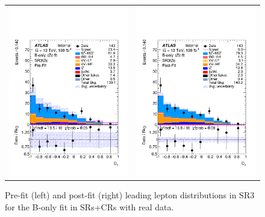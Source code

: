 \begin{figure}[htbp]
	\centering
	\begin{tabular}{cc}
		\includegraphics[width=.45\textwidth]{Chapters/CH8/figures/BONLY_CRSR_DL1rc_unblind/Plots/SR3} &
		\includegraphics[width=.45\textwidth]{Chapters/CH8/figures/BONLY_CRSR_DL1rc_unblind/Plots/SR3_postFit} \\
	\end{tabular}
	\caption{Pre-fit (left) and post-fit (right) leading lepton \pt distributions in SR3 for the B-only \tZc fit in SRs+CRs with real data.
		\ErrStatSys
	}%
	\label{fig:stat:tzc:splusb:crsr:srplots:2_unb}
\end{figure}

